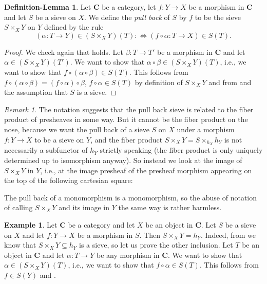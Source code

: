 \documentclass[12pt,reqno,a4paper]{amsart}
\theoremstyle{plain}
\theoremstyle{definition}
\newtheorem{defnlm}[thm]{Definition-Lemma}
\newtheorem{exmp}[thm]{Example}
\theoremstyle{remark}
\newtheorem{rem}[thm]{Remark}
\begin{document}
\begin{defnlm}\label{defnlm:pullback}
  Let $\mathbf{C}$ be a category, let $f \colon Y \to X$  be a morphism in $\mathbf{C}$ and let $S$ be a sieve on $X$.
  We define the \textit{pull back} of $S$ by $f$ to be the sieve $S \times_{X} Y$ on $Y$ defined by the rule
  \[ (\alpha \colon T \to Y) \in (S\times_{X} Y)(T) : \Leftrightarrow (f \circ \alpha \colon T \to X) \in S(T). \]
  \begin{proof}
    We check again that  holds.
    Let $\beta \colon T \to T'$ be a morphism in $\mathbf{C}$ and let $\alpha \in (S\times_{X} Y)(T')$.
    We want to show that $\alpha \circ \beta \in (S \times_{X} Y)(T)$, i.e., we want to show that $f \circ (\alpha \circ \beta) \in S(T)$.
    This follows from $f \circ (\alpha \circ \beta) = (f \circ \alpha) \circ \beta$, $f \circ \alpha \in S(T)$ by definition of $S \times_{X} Y$ and from  and the assumption that $S$ is a sieve.
  \end{proof}
\end{defnlm}

\begin{rem}
  The notation suggests that the pull back sieve is related to the fiber product of presheaves in some way.
  But it cannot be the fiber product on the nose, because we want the pull back of a sieve $S$ on $X$ under a morphism $f \colon Y \to X$ to be a sieve on $Y$, and the fiber product $S \times_{X} Y = S \times_{h_{X}} h_{Y}$ is not necessarily a subfunctor of $h_{Y}$ strictly speaking (the fiber product is only uniquely determined up to isomorphism anyway).
  So instead we look at the image of $S \times_{X} Y$ in $Y$, i.e., at the image presheaf of the presheaf morphism appearing on the top of the following cartesian square:
  \begin{center}
  \end{center}
  The pull back of a monomorphism is a monomorphism, so the abuse of notation of calling $S \times_{X} Y$ and its image in $Y$ the same way is rather harmless.
\end{rem}

\begin{exmp}\label{exmp:pullbacksieve}
  Let $\mathbf{C}$ be a category and let $X$ be an object in $\mathbf{C}$.
  Let $S$ be a sieve on $X$ and let $f \colon Y \to X$ be a morphism in $S$.
  Then $S \times_{X} Y = h_{Y}$.
  Indeed, from  we know that $S \times_{X} Y \subseteq h_{Y}$ is a sieve, so let us prove the other inclusion.
  Let $T$ be an object in $\mathbf{C}$ and let $\alpha \colon T \to Y$ be any morphism in $\mathbf{C}$.
  We want to show that $\alpha \in (S \times_{X} Y)(T)$, i.e., we want to show that $f \circ \alpha \in S(T)$.
  This follows from $f \in S(Y)$ and .
\end{exmp}
\end{document}
